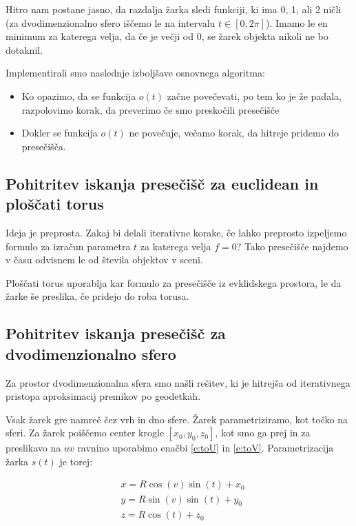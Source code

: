 \documentclass[titlepage]{article}
\begin{document}
Hitro nam postane jasno, da razdalja žarka sledi funkciji, ki ima 0, 1, ali 2 ničli (za dvodimenzionalno sfero iščemo le na intervalu \(t \in [0, 2\pi] \)). 
Imamo le en minimum za katerega velja, da če je večji od 0, se žarek objekta nikoli ne bo dotaknil.

Implementirali smo naslednje izboljšave osnovnega algoritma:
\begin{itemize}
  \item Ko opazimo, da se funkcija \( o(t) \) začne povečevati, po tem ko je že padala, 
  razpolovimo korak, da preverimo če smo preskočili presečišče
  \item Dokler se funkcija \( o(t) \) ne povečuje, večamo korak, da hitreje pridemo do presečišča.
\end{itemize}

\subsection{Pohitritev iskanja presečišč za euclidean in ploščati torus}

Ideja je preprosta. Zakaj bi delali iterativne korake, če lahko preprosto izpeljemo 
formulo za izračun parametra \( t \) za katerega velja \( f = 0 \)? Tako presečišče 
najdemo v času odvisnem le od števila objektov v sceni.

Ploščati torus uporablja kar formulo za presečišče iz evklidskega prostora, le da žarke še preslika, če pridejo do roba torusa.

\subsection{Pohitritev iskanja presečišč za dvodimenzionalno sfero}

Za prostor dvodimenzionalna sfera smo našli rešitev, ki je hitrejša od iterativnega pristopa aproksimacij premikov po geodetkah.

Vsak žarek gre namreč čez vrh in dno sfere. Žarek parametriziramo, kot točko na sferi. Za žarek poiščemo center 
krogle \( [x_0, y_0, z_0] \), kot smo ga prej in za preslikavo na $uv$ ravnino uporabimo enačbi \ref{e:toU} in \ref{e:toV}. 
Parametrizacija žarka \(s(t)\) je torej:

\begin{equation}
  \begin{split}
    &x = R\cos(v)\sin(t) + x_0 \\
    &y = R\sin(v) \sin(t) + y_0 \\
    &z = R\cos(t) + z_0
  \end{split}
\end{equation}
\end{document}
